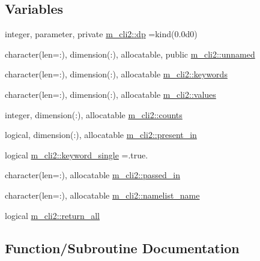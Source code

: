 \subsection*{Variables}
\begin{DoxyCompactItemize}
\item 
integer, parameter, private \mbox{\hyperlink{namespacem__cli2_acf83f1963cf6a56ad0221cfcf5402440}{m\+\_\+cli2\+::dp}} =kind(0.\+0d0)
\item 
character(len=\+:), dimension(\+:), allocatable, public \mbox{\hyperlink{namespacem__cli2_a5b03781cb432174f4ee8d734ecbb9604}{m\+\_\+cli2\+::unnamed}}
\item 
character(len=\+:), dimension(\+:), allocatable \mbox{\hyperlink{namespacem__cli2_a314f3903115db4ab9e2ec03b540aec76}{m\+\_\+cli2\+::keywords}}
\item 
character(len=\+:), dimension(\+:), allocatable \mbox{\hyperlink{namespacem__cli2_af631ee3a1bca98e9fbf1f80646dae360}{m\+\_\+cli2\+::values}}
\item 
integer, dimension(\+:), allocatable \mbox{\hyperlink{namespacem__cli2_abf81746a55c2218c7f2de15602bc0be8}{m\+\_\+cli2\+::counts}}
\item 
logical, dimension(\+:), allocatable \mbox{\hyperlink{namespacem__cli2_adf9ffb8a34d1bd666fa91ed953bcb9f4}{m\+\_\+cli2\+::present\+\_\+in}}
\item 
logical \mbox{\hyperlink{namespacem__cli2_a7f0b96691836126dc7f258a3da75b494}{m\+\_\+cli2\+::keyword\+\_\+single}} =.true.
\item 
character(len=\+:), allocatable \mbox{\hyperlink{namespacem__cli2_a649439045139e5473091df65ecde6a4b}{m\+\_\+cli2\+::passed\+\_\+in}}
\item 
character(len=\+:), allocatable \mbox{\hyperlink{namespacem__cli2_a46b2d1d3b3dbe6fb8b96c7459f3e8046}{m\+\_\+cli2\+::namelist\+\_\+name}}
\item 
logical \mbox{\hyperlink{namespacem__cli2_abbcd01a5c2a1e6030d09f3a5dbe1fa45}{m\+\_\+cli2\+::return\+\_\+all}}
\end{DoxyCompactItemize}


\subsection{Function/\+Subroutine Documentation}
\mbox{\label{M__CLI2_8f90_aa26f90016621d1ee43d3b5b66316532b}} 
